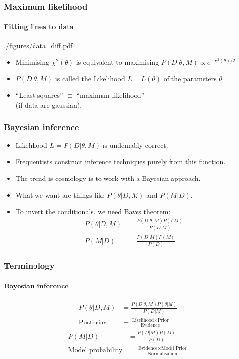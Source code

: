 \documentclass[%
]{beamer}
\begin{document}
\begin{frame}
    \frametitle{Maximum likelihood}
    \framesubtitle{Fitting lines to data}
    \begin{figleft}[0.6]{./figures/data_diff.pdf}
        \begin{itemize}
            \item Minimising $\chi^2(\theta)$  is equivalent to maximising $P(D|\theta,M) \propto e^{-\chi^2(\theta)/2}$
            \item $P(D|\theta,M)$ is called the Likelihood $L=L(\theta)$ of the parameters $\theta$
            \item ``Least squares'' $\equiv$ ``maximum likelihood'' \\(if data are gaussian).
        \end{itemize}
    \end{figleft}
\end{frame}

\begin{frame}
    \frametitle{Bayesian inference}
    \begin{itemize}
        \item Likelihood $L=P(D|\theta,M)$ is undeniably correct.
        \item Frequentists construct inference techniques purely from this function.
        \item The trend is cosmology is to work with a Bayesian approach.
        \item What we want are things like $P(\theta|D,M)$ and $P(M|D)$.
        \item To invert the conditionals, we need Bayes theorem:
            \begin{align}
                P(\theta|D,M) &= \frac{P(D|\theta,M) P(\theta|M)}{P(D|M)} \nonumber\\
                P(M|D) &= \frac{P(D|M) P(M)}{P(D)} \nonumber
            \end{align}
    \end{itemize}
\end{frame}

\begin{frame}
    \frametitle{Terminology}
    \framesubtitle{Bayesian inference}
    \begin{align}
        P(\theta|D,M) &= \frac{P(D|\theta,M) P(\theta|M)}{P(D|M)} \nonumber\\
        \text{Posterior} &= \frac{\text{Likelihood}\times\text{Prior}}{\text{Evidence}} \nonumber
    \end{align}
    \begin{align}
        P(M|D) &= \frac{P(D|M) P(M)}{P(D)} \nonumber\\
        \text{Model probability} &= \frac{\text{Evidence}\times\text{Model Prior}}{\text{Normalisation}} \nonumber
    \end{align}
\end{frame}
\end{document}
